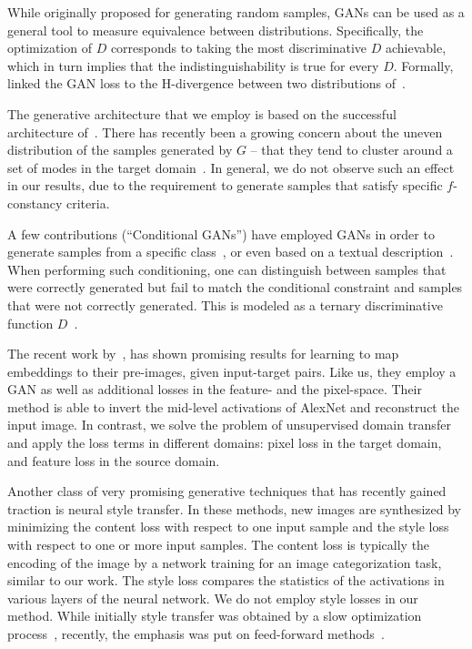 \documentclass{article} \usepackage{iclr2017_conference,times}
\begin{document}
While originally proposed for generating random samples, GANs can be used as a general tool to measure equivalence between distributions. Specifically, the optimization of $D$ corresponds to taking the most discriminative $D$ achievable, which in turn implies that the indistinguishability is true for every $D$. Formally,~\citet{domaingan} linked the GAN loss to the H-divergence between two distributions of~\citet{bendavid}.

The generative architecture that we employ is based on the successful architecture of~\citet{dcgan}. There has recently been a growing concern about the uneven distribution of the samples generated by $G$ -- that they tend to cluster around a set of modes in the target domain~\citep{gantricks}. In general, we do not observe such an effect in our results, due to the requirement to generate samples that satisfy specific $f$-constancy criteria. 

A few contributions (``Conditional GANs'') have employed GANs in order to generate samples from a specific class~\citep{mirza2014conditional}, or even based on a textual description~\citep{RAYLLS16}. When performing such conditioning, one can distinguish between samples that were correctly generated but fail to match the conditional constraint and samples that were not correctly generated. This is modeled as a ternary discriminative function $D$~\citep{RAYLLS16,introspectivegan}.

The recent work by~\citet{deepsim}, has shown promising results for learning to map embeddings to their pre-images, given input-target pairs. Like us, they employ a GAN as well as additional losses in the feature- and the pixel-space. Their method is able to invert the mid-level activations of AlexNet and reconstruct the input image. In contrast, we solve the problem of unsupervised domain transfer and apply the loss terms in different domains: pixel loss in the target domain, and feature loss in the source domain. 

Another class of very promising generative techniques that has recently gained traction is neural style transfer. In these methods, new images are synthesized by minimizing the content loss with respect to one input sample and the style loss with respect to one or more input samples. The content loss is typically the encoding of the image by a network training for an image categorization task, similar to our work. The style loss compares the statistics of the activations in various layers of the neural network. We do not employ style losses in our method. While initially style transfer was obtained by a slow optimization process~\citep{styletransfer}, recently, the emphasis was put on feed-forward methods~\citep{ulyanov16texture,Johnson2016Perceptual}. 
\end{document}
